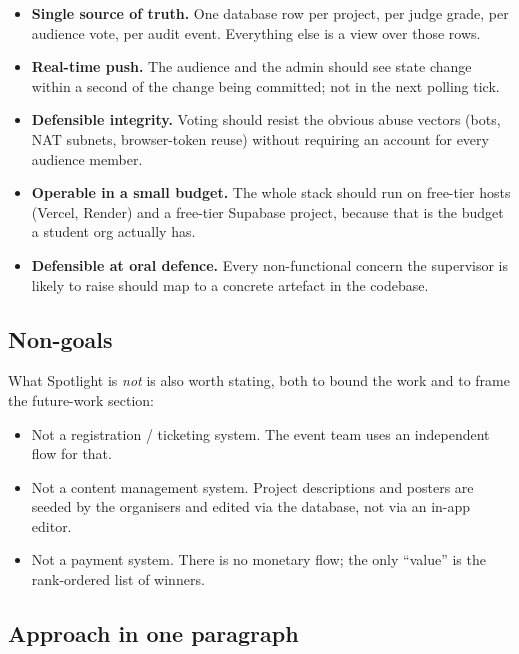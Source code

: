 \begin{itemize}[leftmargin=*]
  \item \textbf{Single source of truth.} One database row per project, per
        judge grade, per audience vote, per audit event. Everything else is a
        view over those rows.
  \item \textbf{Real-time push.} The audience and the admin should see state
        change within a second of the change being committed; not in the
        next polling tick.
  \item \textbf{Defensible integrity.} Voting should resist the obvious abuse
        vectors (bots, NAT subnets, browser-token reuse) without requiring an
        account for every audience member.
  \item \textbf{Operable in a small budget.} The whole stack should run on
        free-tier hosts (Vercel, Render) and a free-tier Supabase project,
        because that is the budget a student org actually has.
  \item \textbf{Defensible at oral defence.} Every non-functional concern
        the supervisor is likely to raise should map to a concrete artefact
        in the codebase.
\end{itemize}

\subsection{Non-goals}

What Spotlight is \emph{not} is also worth stating, both to bound the work
and to frame the future-work section:

\begin{itemize}[leftmargin=*]
  \item Not a registration / ticketing system. The event team uses an
        independent flow for that.
  \item Not a content management system. Project descriptions and posters are
        seeded by the organisers and edited via the database, not via an
        in-app editor.
  \item Not a payment system. There is no monetary flow; the only ``value''
        is the rank-ordered list of winners.
\end{itemize}

\subsection{Approach in one paragraph}

